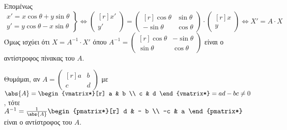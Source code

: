 \documentclass[a4paper,table]{report}
\begin{document}
\begin{solution}
  Επομένως
  \[
    \left.
      \begin{matrix}
        x' = x \cos{\theta} + y \sin{\theta} \\
        y' = y \cos{\theta} - x \sin{\theta}
      \end{matrix} 
    \right\} 
    \Leftrightarrow 
    \begin{pmatrix*}[r] x' \\ y' \end{pmatrix*} = 
    \begin{pmatrix*}[r]
      \cos{\theta} & \sin{\theta} \\
      - \sin{\theta} & \cos{\theta}
    \end{pmatrix*}
    \cdot 
    \begin{pmatrix*}[r] x \\ y \end{pmatrix*} 
    \Leftrightarrow 
    X' = A\cdot X
  \] 
  Όμως ισχύει ότι $ X = A^{-1} \cdot X' $ όπου $ A^{-1} = 
  \begin{pmatrix*}[r]
    \cos{\theta} & - \sin{\theta} \\
    \sin{\theta} & \cos{\theta}
  \end{pmatrix*} $ 
  είναι ο αντίστροφος πίνακας του $A$.
  \begin{mybox1}
    Θυμάμαι, αν $ A=  
    \begin{pmatrix*}[r]
      a & b \\
      c & d
    \end{pmatrix*}
    $ με $ \abs{A} = 
    \begin{vmatrix*}[r]
      a & b \\
      c & d
    \end{vmatrix*} = ad - bc \neq 0
    $, τότε $ A^{-1} = \frac{1}{\abs{A}}
    \begin{pmatrix*}[r]
      d & - b \\
      -c & a
    \end{pmatrix*}
    $ είναι ο αντίστροφος του $A$.
  \end{mybox1}


\end{solution}
\end{document}
